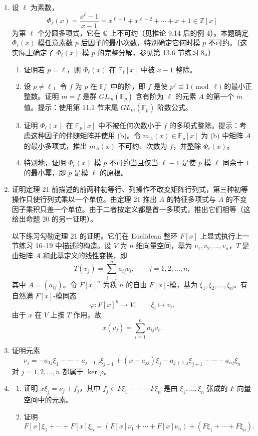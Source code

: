 \begin{enumerate}[label=\arabic*.]
\item 设 $\ell$ 为素数，
\[
\Phi_\ell(x)=\frac{x^\ell-1}{x-1}=x^{\ell-1}+x^{\ell-2}+\cdots+x+1\in\mathbb Z[x]
\]
为第 $\ell$ 个分圆多项式，它在 $\mathbb Q$ 上不可约（见推论 9.14 后的例 4）。本题确定 $\Phi_\ell(x)$ 模任意素数 $p$ 后因子的最小次数，特别确定它何时模 $p$ 不可约。（这实际上确定了 $\Phi_\ell(x)$ 模 $p$ 的完整分解，参见第 13.6 节练习 8。）
\begin{enumerate}[label=(\alph*)]
\item 证明若 $p=\ell$，则 $\Phi_\ell(x)$ 在 $\mathbb F_\ell[x]$ 中被 $x-1$ 整除。
\item 设 $p\ne\ell$，令 $f$ 为 $p$ 在 $\mathbb F_\ell^\times$ 中的阶，即 $f$ 是使 $p^f\equiv1\pmod\ell$ 的最小正整数。证明 $m=f$ 是群 $GL_m(\mathbb F_p)$ 含有阶为 $\ell$ 的元素 $A$ 的第一个 $m$ 值。提示：使用第 11.1 节末尾 $GL_m(\mathbb F_p)$ 阶数公式。
\item 证明 $\Phi_\ell(x)$ 在 $\mathbb F_p[x]$ 中不被任何次数小于 $f$ 的多项式整除。提示：考虑这种因子的伴随矩阵并使用 (b)。令 $m_A(x)\in\mathbb F_p[x]$ 为 (b) 中矩阵 $A$ 的最小多项式，推出 $m_A(x)$ 不可约、次数为 $f$，并整除 $\Phi_\ell(x)$。
\item 特别地，证明 $\Phi_\ell(x)$ 模 $p$ 不可约当且仅当 $\ell-1$ 是使 $p$ 模 $\ell$ 同余于 $1$ 的最小幂，即 $p$ 是模 $\ell$ 的原根。
\end{enumerate}

\item 证明定理 21 前描述的前两种初等行、列操作不改变矩阵行列式，第三种初等操作只使行列式乘以一个单位。由定理 21 推出 $A$ 的特征多项式与 $A$ 的不变因子乘积只差一个单位。由于二者按定义都是首一多项式，推出它们相等（这给出命题 20 的另一证明）。

\medskip
以下练习勾勒定理 21 的证明。它们在 Euclidean 整环 $F[x]$ 上显式执行上一节练习 16--19 中描述的构造。设 $V$ 为 $n$ 维向量空间，基为 $v_1,v_2,\ldots,v_n$，$T$ 是由矩阵 $A$ 和此基定义的线性变换，即
\[
T(v_j)=\sum_{i=1}^n a_{ij}v_i,
\qquad j=1,2,
\ldots,n,
\]
其中 $A=(a_{ij})$。令 $F[x]^n$ 为秩 $n$ 的自由 $F[x]$-模，基为 $\xi_1,\xi_2,
\ldots,\xi_n$。有自然满 $F[x]$-模同态
\[
\varphi:F[x]^n\to V,
\qquad \xi_i\mapsto v_i.
\]
由于 $x$ 在 $V$ 上按 $T$ 作用，故
\[
x(v_j)=\sum_{i=1}^n a_{ij}v_i.
\]

\item 证明元素
\[
\nu_j=-a_{1j}\xi_1-\cdots-a_{j-1,j}\xi_{j-1}+(x-a_{jj})\xi_j-a_{j+1,j}\xi_{j+1}-\cdots-a_{nj}\xi_n
\]
对 $j=1,2,
\ldots,n$ 都属于 $\ker\varphi$。

\item
\begin{enumerate}[label=(\alph*)]
\item 证明 $x\xi_j=\nu_j+f_j$，其中 $f_j\in F\xi_1+\cdots+F\xi_n$ 是由 $\xi_1,
\ldots,
\xi_n$ 张成的 $F$-向量空间中的元素。
\item 证明
\[
F[x]\xi_1+\cdots+F[x]\xi_n
=(F[x]\nu_1+\cdots+F[x]\nu_n)+(F\xi_1+\cdots+F\xi_n).
\]
\end{enumerate}


\end{enumerate}
